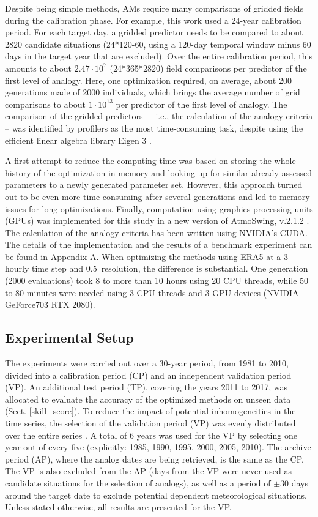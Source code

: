 \documentclass[draft]{agujournal2019}
\begin{document}
Despite being simple methods, AMs require many comparisons of gridded fields during the calibration phase. For example, this work used a 24-year calibration period. For each target day, a gridded predictor needs to be compared to about 2820 candidate situations (24*120-60, using a 120-day temporal window minus 60 days in the target year that are excluded). Over the entire calibration period, this amounts to about $2.47\cdot10^7$ (24*365*2820) field comparisons per predictor of the first level of analogy. Here, one optimization required, on average, about 200 generations made of 2000 individuals, which brings the average number of grid comparisons to about $1\cdot10^{13}$ per predictor of the first level of analogy. The comparison of the gridded predictors –- i.e., the calculation of the analogy criteria -- was identified by profilers as the most time-consuming task, despite using the efficient linear algebra library Eigen 3 \cite{Guennebaud2010}.

A first attempt to reduce the computing time was based on storing the whole history of the optimization in memory and looking up for similar already-assessed parameters to a newly generated parameter set. However, this approach turned out to be even more time-consuming after several generations and led to memory issues for long optimizations. Finally, computation using graphics processing units (GPUs) was implemented for this study in a new version of AtmoSwing, v.2.1.2 \cite{Horton2019b}. The calculation of the analogy criteria has been written using NVIDIA's CUDA. The details of the implementation and the results of a benchmark experiment can be found in Appendix A. When optimizing the methods using ERA5 at a 3-hourly time step and 0.5\degree\ resolution, the difference is substantial. One generation (2000 evaluations) took 8 to more than 10 hours using 20 CPU threads, while 50 to 80 minutes were needed using 3 CPU threads and 3 GPU devices (NVIDIA GeForce703 RTX 2080).


\subsection{Experimental Setup}
\label{setup}

The experiments were carried out over a 30-year period, from 1981 to 2010, divided into a calibration period (CP) and an independent validation period (VP). An additional test period (TP), covering the years 2011 to 2017, was allocated to evaluate the accuracy of the optimized methods on unseen data (Sect. \ref{skill_score}). To reduce the impact of potential inhomogeneities in the time series, the selection of the validation period (VP) was evenly distributed over the entire series \cite<as in>[]{BenDaoud2010}. A total of 6 years was used for the VP by selecting one year out of every five (explicitly: 1985, 1990, 1995, 2000, 2005, 2010). The archive period (AP), where the analog dates are being retrieved, is the same as the CP. The VP is also excluded from the AP (days from the VP were never used as candidate situations for the selection of analogs), as well as a period of $\pm30$ days around the target date to exclude potential dependent meteorological situations. Unless stated otherwise, all results are presented for the VP.
\end{document}
